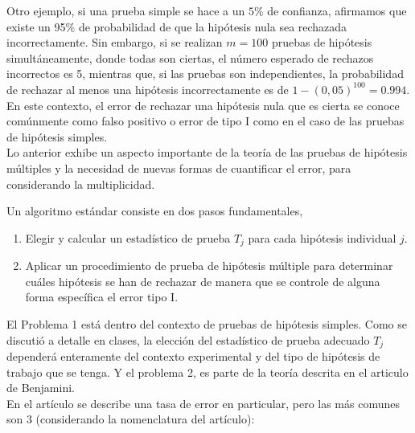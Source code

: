 \documentclass[11pt,letterpaper]{article}
\begin{document}
Otro ejemplo, si una prueba simple se hace a un $5\%$ de confianza, afirmamos que existe un 95$\%$ de probabilidad de que la hipótesis nula sea rechazada incorrectamente. Sin embargo, si se realizan $m = 100$ pruebas de hipótesis simultáneamente, donde todas son ciertas, el número esperado de rechazos incorrectos es 5, mientras que, si las pruebas son independientes, la probabilidad de rechazar al menos una hipótesis incorrectamente es de $1-(0,05)^100 = 0.994$. En este contexto, el error de rechazar una hipótesis nula que es cierta se conoce comúnmente como falso positivo o error
de tipo I como en el caso de las pruebas de hipótesis simples. \\
Lo anterior exhibe un aspecto importante de la teoría de las pruebas de hipótesis múltiples y la necesidad de nuevas formas de cuantificar el error, para considerando la multiplicidad.

Un algoritmo estándar consiste en dos pasos fundamentales, 
\begin{enumerate}
\item Elegir y calcular un estadístico de prueba $T_j$ para cada hipótesis individual $j$.

\item Aplicar un procedimiento de prueba de hipótesis múltiple para determinar cuáles hipótesis se han de rechazar de manera que se controle de alguna forma específica el error tipo I.
\end{enumerate}

El Problema 1 está dentro del contexto de pruebas de hipótesis simples. Como se discutió a detalle en
clases, la elección del estadístico de prueba adecuado $T_j$ dependerá enteramente del contexto experimental y del tipo de hipótesis de trabajo que se tenga. Y el problema 2, es parte de la teoría descrita en el articulo de Benjamini. \\

En el artículo se describe una tasa de error en particular, pero las más comunes son 3 (considerando la nomenclatura del artículo):
\end{document}
